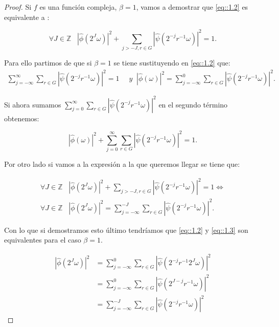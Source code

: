 \begin{proof}
\noindent Si $f$ es una función compleja, $\beta=1$, vamos a demostrar que \eqref{eq::1.2} es equivalente a : 

\begin{equation} \label{eq::1.3}
  \forall J \in \mathbb{Z} \; \; \; \left|\widehat{\phi}\left(2^J\omega\right)\right|^2 + \sum_{j>-J,r\in G}\left|\widehat{\psi}\left(2^{-j}r^{-1}\omega\right)\right|^2=1.
\end{equation}

\noindent Para ello partimos de que si $\beta=1$ se tiene sustituyendo en \eqref{eq::1.2} que: 
     \begin{align*}
        \sum_{j=-\infty}^\infty \sum_{r \in G} |\widehat{\psi}(2^{-j}r^{-1}\omega)|^2=1 & \; \; y
        \;\;|\widehat{\phi}(\omega)|^2= \sum_{j=-\infty}^0 \sum_{r\in G} |\widehat{\psi}(2^{-j}r^{-1}\omega)|^2.
    \end{align*}

\noindent Si ahora sumamos $\sum_{j=0}^{\infty} \sum_{r\in G} |\widehat{\psi}(2^{-j}r^{-1}\omega)|^2$ en el segundo término obtenemos: 

$$|\widehat{\phi}(\omega)|^2 + \sum_{j=0}^{\infty} \sum_{r\in G} |\widehat{\psi}(2^{-j}r^{-1}\omega)|^2=1.$$

\noindent Por otro lado si vamos a la expresión a la que queremos llegar se tiene que: 

\begin{align*}
  \forall J \in \mathbb{Z} \; \; \; \left|\widehat{\phi}\left(2^J\omega\right)\right|^2 + \sum_{j>-J,r\in G}\left|\widehat{\psi}\left(2^{-j}r^{-1}\omega\right)\right|^2=1 \iff \\
  \forall J \in \mathbb{Z} \; \; \; \left|\widehat{\phi}\left(2^J\omega\right)\right|^2=\sum_{j=-\infty}^{-J} \sum_{r\in G} |\widehat{\psi}(2^{-j}r^{-1}\omega)|^2.
\end{align*}

\noindent Con lo que si demostramos esto último tendríamos que \eqref{eq::1.2} y \eqref{eq::1.3} son equivalentes para el caso $\beta=1$. 


     \begin{align*}
        \left|\widehat{\phi}\left(2^J\omega\right)\right|^2 & =\sum_{j=-\infty}^{0} \sum_{r\in G} |\widehat{\psi}(2^{-j}r^{-1}2^J\omega)|^2 \\
        & = \sum_{j=-\infty}^{0} \sum_{r\in G} |\widehat{\psi}(2^{J-j}r^{-1}\omega)|^2  \\
        & =\sum_{j=-\infty}^{-J} \sum_{r\in G} |\widehat{\psi}(2^{-j}r^{-1}\omega)|^2  
    \end{align*}
    

\end{proof}
